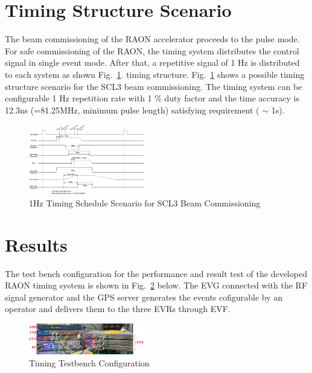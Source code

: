 \documentclass[journal,reqno]{IEEEtran}
\begin{document}
\section{Timing Structure Scenario}
The beam commissioning of the RAON accelerator proceeds to the pulse mode. For safe commissioning of the RAON, the timing system distributes the control signal in single event mode. After that, a repetitive signal of 1 Hz is distributed to each system as shown Fig.~\ref{schedule}. timing structure. Fig.~\ref{schedule} shows a possible timing structure scenario for the SCL3 beam commissioning. The timing system can be configurable 1 Hz repetition rate with 1 \% duty factor and the time accuracy is 12.3ns (=81.25MHz, minimum pulse length) satisfying requirement ( $\sim$ 1s).


\begin{figure}[!htb]
	\centering
	\includegraphics*[width=0.45\textwidth, height=0.35\textwidth]{schedule.png}
	\caption{1Hz Timing Schedule Scenario for SCL3 Beam Commissioning}
	\label{schedule}
\end{figure}

\section{Results}
The test bench configuration for the performance and result test of the developed RAON timing system is shown in Fig.~\ref{timing_testbench} below. The EVG connected with the RF signal generator and the GPS server generates the events cofigurable by an operator and delivers them to the three EVRs through EVF.

\begin{figure}[!htb]
	\centering
	\includegraphics*[width=0.45\textwidth, height=0.12\textwidth]{img18.png}
	\caption{Timing Testbench Configuration}
	\label{timing_testbench}
\end{figure}
\end{document}
